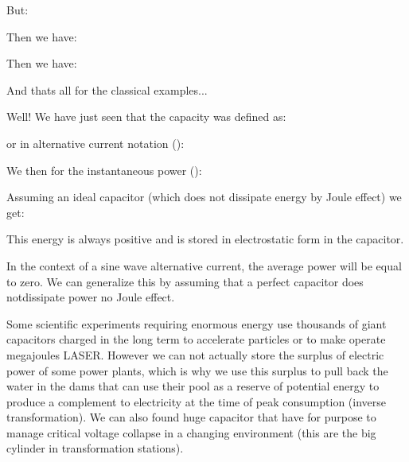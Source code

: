 	But:
	
	Then we have:
	
	Then we have:
	
	And thats all for the classical examples...
	
	Well! We have just seen that the capacity was defined as:
	
	or in alternative current notation ():
	
	We then for the instantaneous power ():	
	
	Assuming an ideal capacitor (which does not dissipate energy by Joule effect) we get:
	
	
	This energy is always positive and is stored in electrostatic form in the capacitor.
	
	In the context of a sine wave alternative current, the average power will be equal to zero. We can generalize this by assuming that a perfect capacitor does notdissipate power no Joule effect.
	\begin{tcolorbox}[title=Remark,colframe=black,arc=10pt]
	Some scientific experiments requiring enormous energy use thousands of giant capacitors charged in the long term to accelerate particles or to make operate megajoules LASER. However we can not actually store the surplus of electric power of some power plants, which is why we use this surplus to pull back the water in the dams that can use their pool as a reserve of potential energy to produce a complement to electricity at the time of peak consumption (inverse transformation). We can also found huge capacitor that have for purpose to manage critical voltage collapse in a changing environment (this are the big cylinder in transformation stations).
	\end{tcolorbox}
	
	
